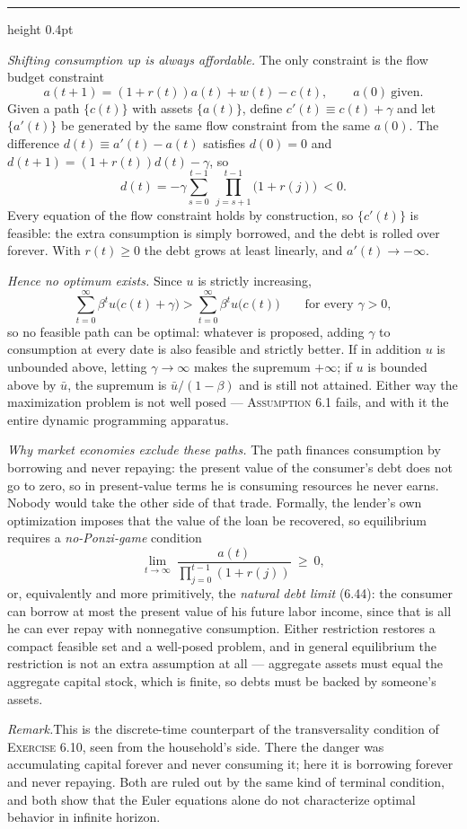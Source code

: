 \documentclass[11pt,letterpaper,reqno]{amsart}
\makeatletter
\newcommand{\as@head}[3]{%
  \par\addvspace{1.6ex}\penalty-200\relax
  \phantomsection
  \addcontentsline{toc}{subsection}{#1 #2\texorpdfstring{\ifx\relax#3\relax\else\quad #3\fi}{}}%
  {\color{RuleGrey}\hrule height 0.4pt}%
  \nobreak\vspace{0.8ex}\nobreak
  \noindent{\bfseries #1 #2}%
  \ifx\relax#3\relax\else\quad{\bfseries\itshape #3}\fi
  \par\nobreak\vspace{0.4ex}\nobreak
  \as@beginstatement
}
\newcommand{\as@beginstatement}{\begingroup\itshape\ignorespaces}
\newenvironment{aex}[2]{\as@head{Exercise}{#1}{#2}}{\par\addvspace{1.2ex}}
\newcommand{\rmk}[1]{%
  \par\vspace{0.6ex}%
  {\small\noindent\textit{Remark.}\hspace{0.5em}#1\par}%
  \vspace{0.4ex}%
}
\newcommand{\bk}[1]{\textup{\textsc{#1}}}
\renewcommand{\as@beginstatement}{\ignorespaces}
\makeatother
\begin{document}
\begin{aex}{6.11}{}
\emph{Shifting consumption up is always affordable.}  The only constraint is the flow budget constraint
\[
a(t+1)=(1+r(t))a(t)+w(t)-c(t),
\qquad a(0)\ \text{given}.
\]
Given a path $\{c(t)\}$ with assets $\{a(t)\}$, define $c'(t)\equiv c(t)+\gamma$ and let $\{a'(t)\}$ be
generated by the same flow constraint from the same $a(0)$.  The difference
$d(t)\equiv a'(t)-a(t)$ satisfies $d(0)=0$ and $d(t+1)=(1+r(t))d(t)-\gamma$, so
\[
d(t)=-\gamma\sum_{s=0}^{t-1}\ \prod_{j=s+1}^{t-1}\bigl(1+r(j)\bigr)\ <0 .
\]
Every equation of the flow constraint holds by construction, so $\{c'(t)\}$ is feasible: the extra
consumption is simply borrowed, and the debt is rolled over forever.  With $r(t)\ge0$ the debt grows at
least linearly, and $a'(t)\to-\infty$.

\emph{Hence no optimum exists.}  Since $u$ is strictly increasing,
\[
\sum_{t=0}^{\infty}\beta^{t}u\bigl(c(t)+\gamma\bigr)>\sum_{t=0}^{\infty}\beta^{t}u\bigl(c(t)\bigr)
\qquad\text{for every }\gamma>0 ,
\]
so no feasible path can be optimal: whatever is proposed, adding $\gamma$ to consumption at every date is
also feasible and strictly better.  If in addition $u$ is unbounded above, letting $\gamma\to\infty$ makes
the supremum $+\infty$; if $u$ is bounded above by $\bar u$, the supremum is $\bar u/(1-\beta)$ and is still
not attained.  Either way the maximization problem is not well posed --- \bk{Assumption 6.1} fails, and with
it the entire dynamic programming apparatus.

\emph{Why market economies exclude these paths.}  The path finances consumption by borrowing and never
repaying: the present value of the consumer's debt does not go to zero, so in present-value terms he is
consuming resources he never earns.  Nobody would take the other side of that trade.  Formally, the lender's
own optimization imposes that the value of the loan be recovered, so equilibrium requires a
\emph{no-Ponzi-game} condition
\[
\lim_{t\to\infty}\ \frac{a(t)}{\prod_{j=0}^{t-1}(1+r(j))}\ \ge\ 0 ,
\]
or, equivalently and more primitively, the \emph{natural debt limit} \bk{(6.44)}: the consumer can borrow at
most the present value of his future labor income, since that is all he can ever repay with nonnegative
consumption.  Either restriction restores a compact feasible set and a well-posed problem, and in general
equilibrium the restriction is not an extra assumption at all --- aggregate assets must equal the aggregate
capital stock, which is finite, so debts must be backed by someone's assets.

\rmk{This is the discrete-time counterpart of the transversality condition of \bk{Exercise 6.10}, seen from
the household's side.  There the danger was accumulating capital forever and never consuming it; here it is
borrowing forever and never repaying.  Both are ruled out by the same kind of terminal condition, and both
show that the Euler equations alone do not characterize optimal behavior in infinite horizon.}
\end{aex}
\end{document}
